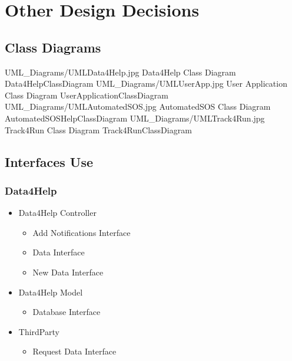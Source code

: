 \documentclass[../../DD.tex]{subfiles}
\begin{document}
\section{Other Design Decisions}
	\subsection{Class Diagrams}
	\image {13cm} {UML_Diagrams/UMLData4Help.jpg} {Data4Help Class Diagram} {Data4HelpClassDiagram}
	\image {13cm} {UML_Diagrams/UMLUserApp.jpg} {User Application Class Diagram} {UserApplicationClassDiagram}
	\image {13cm} {UML_Diagrams/UMLAutomatedSOS.jpg} {AutomatedSOS Class Diagram} {AutomatedSOSHelpClassDiagram}
	\image {13cm} {UML_Diagrams/UMLTrack4Run.jpg} {Track4Run Class Diagram} {Track4RunClassDiagram}

	\subsection{Interfaces Use}
		

		\subsubsection{Data4Help}
		
		\begin{itemize}
			\item Data4Help Controller
			\begin{itemize}
				\item Add Notifications Interface
				\item Data Interface
				\item New Data Interface
			\end{itemize}
			\item Data4Help Model
			\begin{itemize}
				\item Database Interface
			\end{itemize}
			\item ThirdParty
			\begin{itemize}
				\item Request Data Interface
			\end{itemize}
		\end{itemize}
\end{document}

